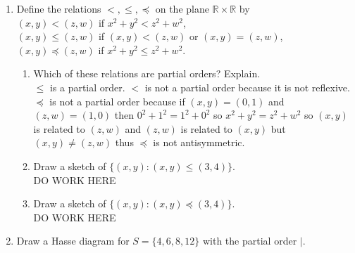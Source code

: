 \documentclass[11pt]{article}
\newcommand{\R}{\mathbb{R}}
\begin{document}
\begin{enumerate}
\begin{enumerate}
	\end{enumerate}
\setcounter{enumi}{14}
\item Define the relations $<,\leq,\preceq$ on the plane $\R\times\R$ by\\
$(x,y)<(z,w)$ if $x^2+y^2<z^2+w^2$,\\
$(x,y)\leq(z,w)$ if $(x,y)<(z,w)$ or $(x,y)=(z,w)$,\\
$(x,y)\preceq(z,w)$ if $x^2+y^2\leq z^2+w^2$.
	\begin{enumerate}
	\item Which of these relations are partial orders? Explain.\\
	$\leq$ is a partial order. $<$ is not a partial order because it is not reflexive. $\preceq$ is not a partial order because 
	if $(x,y)=(0,1)$ and $(z,w)=(1,0)$ then $0^2+1^2=1^2+0^2$ so $x^2+y^2 = z^2+w^2$ so $(x,y)$ is related to $(z,w)$ and $(z,w)$ 	is related to $(x,y)$ but $(x,y)\not=(z,w)$ thus $\preceq$ is not antisymmetric.
	\setcounter{enumii}{2}
	\item Draw a sketch of $\{(x,y):(x,y)\leq (3,4)\}$.\\
	DO WORK HERE
	\item Draw a sketch of $\{(x,y):(x,y)\preceq (3,4)\}$.\\
	DO WORK HERE
	\end{enumerate}
\setcounter{enumi}{0}
\item Draw a Hasse diagram for $S=\{4,6,8,12\}$ with the partial order $\mid$.\\
\end{enumerate}
\end{document}
